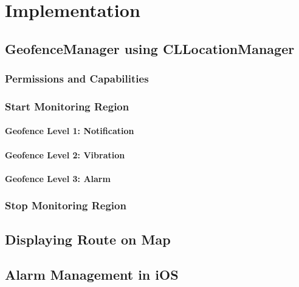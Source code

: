 \chapter{Implementation}
\label{cha:Implementation}

\section{GeofenceManager using CLLocationManager}
\subsection{Permissions and Capabilities}

\subsection{Start Monitoring Region}
\subsubsection{Geofence Level 1: Notification}
\subsubsection{Geofence Level 2: Vibration}
\subsubsection{Geofence Level 3: Alarm}

\subsection{Stop Monitoring Region}

\section{Displaying Route on Map}

\section{Alarm Management in iOS}
